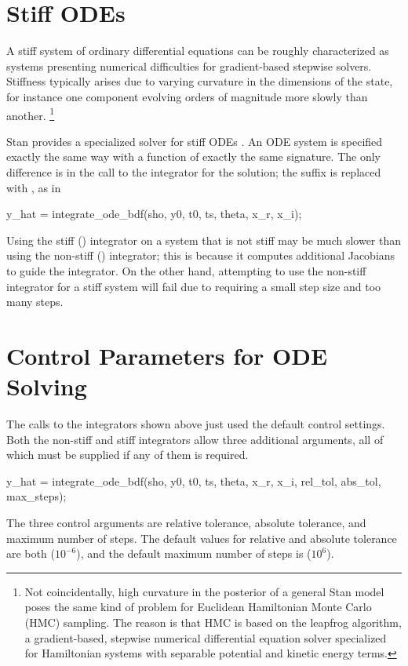 \section{Stiff ODEs}\label{stiff-ode.section}

A stiff system of ordinary differential equations can be roughly
characterized as systems presenting numerical difficulties for
gradient-based stepwise solvers.  Stiffness typically arises due to
varying curvature in the dimensions of the state, for instance one
component evolving orders of magnitude more slowly than another.%
%
\footnote{Not coincidentally, high curvature in the posterior of a
  general Stan model poses the same kind of problem for Euclidean
  Hamiltonian Monte Carlo (HMC) sampling.  The reason is that HMC is
  based on the leapfrog algorithm, a gradient-based, stepwise
  numerical differential equation solver specialized for Hamiltonian
  systems with separable potential and kinetic energy terms.}
%

Stan provides a specialized solver for stiff ODEs
\citep{CohenHindmarsh:1996,SerbanHindmarsh:2005}.  An ODE system is
specified exactly the same way with a function of exactly the same
signature.  The only difference is in the call to the integrator for
the solution; the  suffix is replaced with , as in
%
\begin{stancode}
y_hat = integrate_ode_bdf(sho, y0, t0, ts, theta, x_r, x_i);
\end{stancode}
%

Using the stiff () integrator on a system that is not stiff
may be much slower than using the non-stiff () integrator;
this is because it computes additional Jacobians to guide the
integrator.  On the other hand, attempting to use the non-stiff
integrator for a stiff system will fail due to requiring a small step
size and too many steps.

\section{Control Parameters for ODE Solving}

The calls to the integrators shown above just used the default
control settings.  Both the non-stiff and stiff integrators allow
three additional arguments, all of which must be supplied if any of
them is required.
%
\begin{stancode}
y_hat = integrate_ode_bdf(sho, y0, t0, ts, theta, x_r, x_i,
                          rel_tol, abs_tol, max_steps);
\end{stancode}
%
The three control arguments are relative tolerance, absolute
tolerance, and maximum number of steps.   The default values for
relative and absolute tolerance are both  ($10^{-6}$), and
the default maximum number of steps is  ($10^6$).


